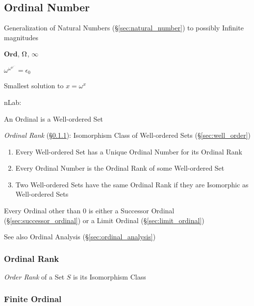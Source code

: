 \subsection{Ordinal Number}\label{sec:ordinal_number}

Generalization of Natural Numbers (\S\ref{sec:natural_number}) to
possibly Infinite magnitudes %

$\mathbf{Ord}$, $\Omega$, $\infty$

$\omega^{\omega^{\omega^{\cdots}}} = \epsilon_0$

Smallest solution to $x = \omega^x$

nLab:

An Ordinal is a Well-ordered Set

\emph{Ordinal Rank} (\S\ref{sec:ordinal_rank}): Isomorphism Class of
Well-ordered Sets (\S\ref{sec:well_order})

\begin{enumerate}
  \item Every Well-ordered Set has a Unique Ordinal Number for its
    Ordinal Rank
  \item Every Ordinal Number is the Ordinal Rank of some Well-ordered
    Set
  \item Two Well-ordered Sets have the same Ordinal Rank if they are
    Isomorphic as Well-ordered Sets
\end{enumerate}

Every Ordinal other than $0$ is either a Successor Ordinal
(\S\ref{sec:successor_ordinal}) or a Limit Ordinal
(\S\ref{sec:limit_ordinal})


\fist See also Ordinal Analysis (\S\ref{sec:ordinal_analysis})



\subsubsection{Ordinal Rank}\label{sec:ordinal_rank}

\emph{Order Rank} of a Set $S$ is its Isomorphism Class



\subsubsection{Finite Ordinal}\label{sec:finite_ordinal}

